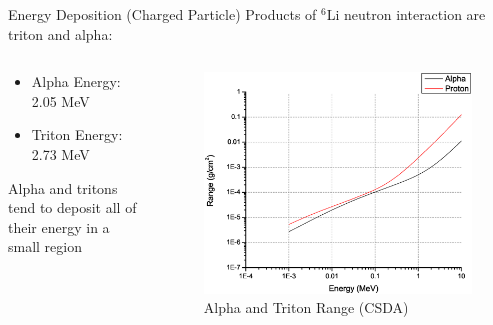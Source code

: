 \begin{frame}{Energy Deposition (Charged Particle)}
Products of ${}^6$Li neutron interaction are triton and alpha:
\begin{columns}[onlytextwidth]
\begin{column}{0.45\textwidth}
\begin{itemize}
	\small
	\item Alpha Energy: 2.05 MeV
	\item Triton Energy: 2.73 MeV
\end{itemize}
Alpha and tritons tend to deposit all of their energy in a small region
\end{column}
\begin{column}{0.45\textwidth}
	\begin{figure}
	\includegraphics[width=\textwidth]{images/PStarAStarRange.eps}
	\caption{Alpha and Triton Range (CSDA) \protect \cite{berger_estar_2005}}
	\label{fig:PStarAStarRange}
	\end{figure}
\end{column}
\end{columns}
\end{frame}

